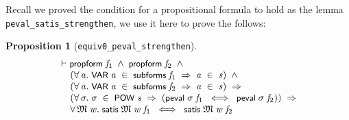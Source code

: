 \documentclass[letterpaper]{article}
\newtheorem{prop}{Proposition}
\renewcommand{\HOLConst}[1]{{\textsf{\upshape\small #1}}}
\newenvironment{holmath}{\begin{displaymath}\begin{array}{l}}{\end{array}\end{displaymath}\ignorespacesafterend}
\begin{document}
Recall we proved the condition for a propositional formula to hold as the lemma \texttt{peval_satis_strengthen}, we use it here to prove the follows:
\begin{prop}[\texttt{equiv0_peval_strengthen}]
\begin{holmath}
  \ensuremath{\HOLTokenTurnstile}\HOLConst{propform}\;\HOLFreeVar{f\sb{\mathrm{1}}}\;\HOLSymConst{\HOLTokenConj{}}\;\HOLConst{propform}\;\HOLFreeVar{f\sb{\mathrm{2}}}\;\HOLSymConst{\HOLTokenConj{}}\\
\;\;\;\;\;(\HOLSymConst{\HOLTokenForall{}}\HOLBoundVar{a}.\;\HOLConst{VAR}\;\HOLBoundVar{a}\;\HOLSymConst{\HOLTokenIn{}}\;\HOLConst{subforms}\;\HOLFreeVar{f\sb{\mathrm{1}}}\;\HOLSymConst{\HOLTokenImp{}}\;\HOLBoundVar{a}\;\HOLSymConst{\HOLTokenIn{}}\;\HOLFreeVar{s})\;\HOLSymConst{\HOLTokenConj{}}\\
\;\;\;\;\;(\HOLSymConst{\HOLTokenForall{}}\HOLBoundVar{a}.\;\HOLConst{VAR}\;\HOLBoundVar{a}\;\HOLSymConst{\HOLTokenIn{}}\;\HOLConst{subforms}\;\HOLFreeVar{f\sb{\mathrm{2}}}\;\HOLSymConst{\HOLTokenImp{}}\;\HOLBoundVar{a}\;\HOLSymConst{\HOLTokenIn{}}\;\HOLFreeVar{s})\;\HOLSymConst{\HOLTokenImp{}}\\
\;\;\;\;\;(\HOLSymConst{\HOLTokenForall{}}\HOLBoundVar{\ensuremath{\sigma}}.\;\HOLBoundVar{\ensuremath{\sigma}}\;\HOLSymConst{\HOLTokenIn{}}\;\HOLConst{POW}\;\HOLFreeVar{s}\;\HOLSymConst{\HOLTokenImp{}}\;(\HOLConst{peval}\;\HOLBoundVar{\ensuremath{\sigma}}\;\HOLFreeVar{f\sb{\mathrm{1}}}\;\HOLSymConst{\HOLTokenEquiv{}}\;\HOLConst{peval}\;\HOLBoundVar{\ensuremath{\sigma}}\;\HOLFreeVar{f\sb{\mathrm{2}}}))\;\HOLSymConst{\HOLTokenImp{}}\\
\;\;\;\;\;\HOLSymConst{\HOLTokenForall{}}\HOLBoundVar{\ensuremath{\mathfrak{M}}}\;\HOLBoundVar{w}.\;\HOLConst{satis}\;\HOLBoundVar{\ensuremath{\mathfrak{M}}}\;\HOLBoundVar{w}\;\HOLFreeVar{f\sb{\mathrm{1}}}\;\HOLSymConst{\HOLTokenEquiv{}}\;\HOLConst{satis}\;\HOLBoundVar{\ensuremath{\mathfrak{M}}}\;\HOLBoundVar{w}\;\HOLFreeVar{f\sb{\mathrm{2}}}
\end{holmath}
\end{prop}
\end{document}
